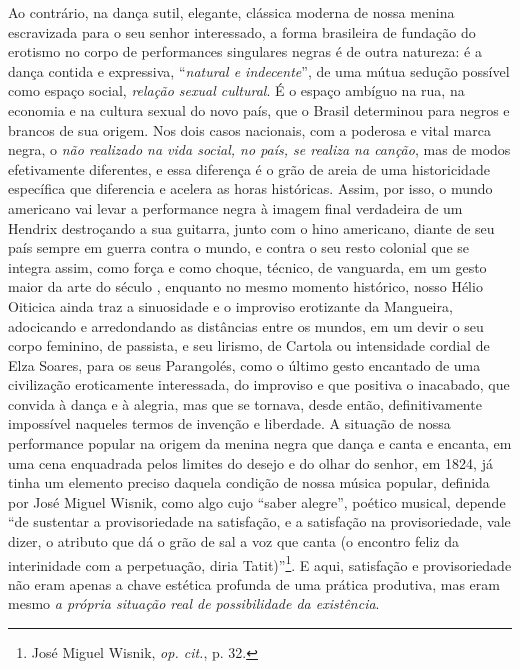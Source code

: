 Ao contrário, na dança sutil, elegante, clássica moderna de nossa menina
escravizada para o seu senhor interessado, a forma brasileira de
fundação do erotismo no corpo de performances singulares negras é de
outra natureza: é a dança contida e expressiva, ``\emph{natural e
indecente}'', de uma mútua sedução possível como espaço social,
\emph{relação sexual cultural}. É o espaço ambíguo na rua, na economia e
na cultura sexual do novo país, que o Brasil determinou para negros e
brancos de sua origem. Nos dois casos nacionais, com a poderosa e vital
marca negra, o \emph{não realizado na vida social, no país, se realiza
na canção}, mas de modos efetivamente diferentes, e essa diferença é o
grão de areia de uma historicidade específica que diferencia e acelera
as horas históricas. Assim, por isso, o mundo americano vai levar a
performance negra à imagem final verdadeira de um Hendrix destroçando a
sua guitarra, junto com o hino americano, diante de seu país sempre em
guerra contra o mundo, e contra o seu resto colonial que se integra
assim, como força e como choque, técnico, de vanguarda, em um gesto
maior da arte do século , enquanto no mesmo momento histórico, nosso
Hélio Oiticica ainda traz a sinuosidade e o improviso erotizante da
Mangueira, adocicando e arredondando as distâncias entre os mundos, em
um devir o seu corpo feminino, de passista, e seu lirismo, de Cartola ou
intensidade cordial de Elza Soares, para os seus Parangolés, como o
último gesto encantado de uma civilização eroticamente interessada, do
improviso e que positiva o inacabado, que convida à dança e à alegria,
mas que se tornava, desde então, definitivamente impossível naqueles
termos de invenção e liberdade. A situação de nossa performance popular
na origem da menina negra que dança e canta e encanta, em uma cena
enquadrada pelos limites do desejo e do olhar do senhor, em 1824, já
tinha um elemento preciso daquela condição de nossa música popular,
definida por José Miguel Wisnik, como algo cujo ``saber alegre'',
poético musical, depende ``de sustentar a provisoriedade na satisfação,
e a satisfação na provisoriedade, vale dizer, o atributo que dá o grão
de sal a voz que canta (o encontro feliz da interinidade com a
perpetuação, diria Tatit)''\footnote{José Miguel Wisnik, \emph{op.
  cit.}, p. 32.}. E aqui, satisfação e provisoriedade não eram apenas a
chave estética profunda de uma prática produtiva, mas eram mesmo \emph{a
própria situação real de possibilidade da existência}.

